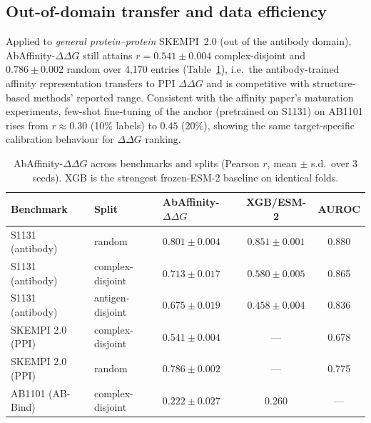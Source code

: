 \documentclass{article}
\newcommand{\ddg}{\ensuremath{\Delta\Delta G}}
\begin{document}
\subsection{Out-of-domain transfer and data efficiency}
Applied to \emph{general protein--protein} SKEMPI~2.0 (out of the antibody domain), AbAffinity-\ddg{}
still attains $r=0.541\pm0.004$ complex-disjoint and $0.786\pm0.002$ random over 4{,}170 entries
(Table~\ref{tab:ddg}), i.e.\ the antibody-trained affinity representation transfers to PPI \ddg{}
and is competitive with structure-based methods' reported range. Consistent with the affinity paper's
maturation experiments, few-shot fine-tuning of the anchor (pretrained on S1131) on AB1101 rises from
$r\approx0.30$ (10\% labels) to $0.45$ (20\%), showing the same target-specific calibration behaviour for
\ddg{} ranking.

\begin{table}[t]\centering
\caption{AbAffinity-\ddg{} across benchmarks and splits (Pearson $r$, mean $\pm$ s.d.\ over 3 seeds).
XGB is the strongest frozen-ESM-2 baseline on identical folds.}
\label{tab:ddg}
\small
\begin{tabular}{lllcc}
\toprule
Benchmark & Split & AbAffinity-\ddg{} & XGB/ESM-2 & AUROC\\
\midrule
S1131 (antibody)   & random           & $0.801\pm0.004$ & $0.851\pm0.001$ & 0.880\\
S1131 (antibody)   & complex-disjoint & $\mathbf{0.713\pm0.017}$ & $0.580\pm0.005$ & 0.865\\
S1131 (antibody)   & antigen-disjoint & $\mathbf{0.675\pm0.019}$ & $0.458\pm0.004$ & 0.836\\
SKEMPI 2.0 (PPI)   & complex-disjoint & $0.541\pm0.004$ & --- & 0.678\\
SKEMPI 2.0 (PPI)   & random           & $0.786\pm0.002$ & --- & 0.775\\
AB1101 (AB-Bind)   & complex-disjoint & $0.222\pm0.027$ & 0.260 & ---\\
\bottomrule
\end{tabular}
\end{table}
\end{document}
